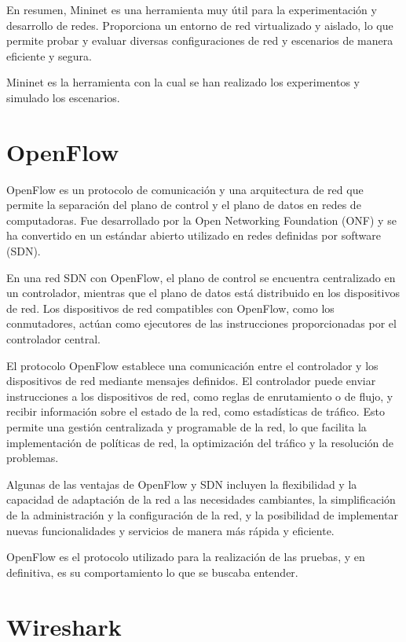 \documentclass[a4paper, 12pt]{book}
\begin{document}
	En resumen, Mininet es una herramienta muy útil para la experimentación y desarrollo de redes. Proporciona un entorno de red virtualizado y aislado, lo que permite probar y evaluar diversas configuraciones de red y escenarios de manera eficiente y segura.
	
	Mininet es la herramienta con la cual se han realizado los experimentos y simulado los escenarios.
	
	\section{OpenFlow}
	\label{sec:openflow}
	
	
	OpenFlow es un protocolo de comunicación y una arquitectura de red que permite la separación del plano de control y el plano de datos en redes de computadoras. Fue desarrollado por la Open Networking Foundation (ONF) y se ha convertido en un estándar abierto utilizado en redes definidas por software (SDN).
	
	En una red SDN con OpenFlow, el plano de control se encuentra centralizado en un controlador, mientras que el plano de datos está distribuido en los dispositivos de red. Los dispositivos de red compatibles con OpenFlow, como los conmutadores, actúan como ejecutores de las instrucciones proporcionadas por el controlador central.
	
	El protocolo OpenFlow establece una comunicación entre el controlador y los dispositivos de red mediante mensajes definidos. El controlador puede enviar instrucciones a los dispositivos de red, como reglas de enrutamiento o de flujo, y recibir información sobre el estado de la red, como estadísticas de tráfico. Esto permite una gestión centralizada y programable de la red, lo que facilita la implementación de políticas de red, la optimización del tráfico y la resolución de problemas.
	
	Algunas de las ventajas de OpenFlow y SDN incluyen la flexibilidad y la capacidad de adaptación de la red a las necesidades cambiantes, la simplificación de la administración y la configuración de la red, y la posibilidad de implementar nuevas funcionalidades y servicios de manera más rápida y eficiente.
	
	OpenFlow es el protocolo utilizado para la realización de las pruebas, y en definitiva, es su comportamiento lo que se buscaba entender.
	
	\section{Wireshark} 
	\label{sec:wireshark}
	
\end{document}
